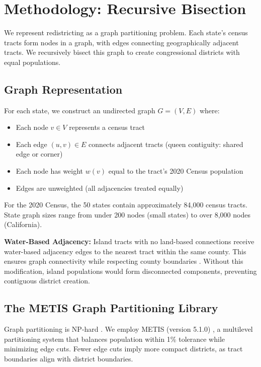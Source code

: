 \section{Methodology: Recursive Bisection}
\label{sec:methodology}

We represent redistricting as a graph partitioning problem. Each state's census tracts form nodes in a graph, with edges connecting geographically adjacent tracts. We recursively bisect this graph to create congressional districts with equal populations.

\subsection{Graph Representation}

For each state, we construct an undirected graph $G = (V, E)$ where:
\begin{itemize}
    \item Each node $v \in V$ represents a census tract
    \item Each edge $(u, v) \in E$ connects adjacent tracts (queen contiguity: shared edge or corner)
    \item Each node has weight $w(v)$ equal to the tract's 2020 Census population \cite{census2020redistricting}
    \item Edges are unweighted (all adjacencies treated equally)
\end{itemize}

For the 2020 Census, the 50 states contain approximately 84,000 census tracts. State graph sizes range from under 200 nodes (small states) to over 8,000 nodes (California).

\textbf{Water-Based Adjacency:} Island tracts with no land-based connections receive water-based adjacency edges to the nearest tract within the same county. This ensures graph connectivity while respecting county boundaries \cite{chen2013unintentional}. Without this modification, island populations would form disconnected components, preventing contiguous district creation.

\subsection{The METIS Graph Partitioning Library}

Graph partitioning is NP-hard \cite{karypis1998fast}. We employ METIS (version 5.1.0) \cite{karypis1995metis}, a multilevel partitioning system that balances population within 1\% tolerance while minimizing edge cuts. Fewer edge cuts imply more compact districts, as tract boundaries align with district boundaries.

